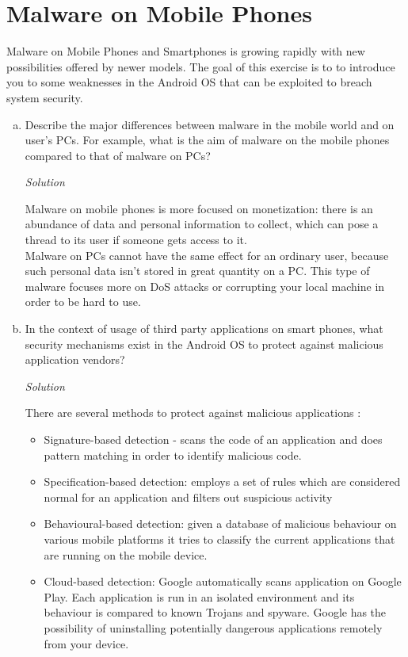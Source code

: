 \documentclass[a4paper,11pt]{article}
\newenvironment{solution}%
{\par\begin{minipage}{\linewidth}{\noindent\small\textit{Solution}\\}\begin{boxedminipage}{\linewidth}}%
{\end{boxedminipage}\end{minipage}\par\bigskip}
\begin{document}
\section{Malware on Mobile Phones}
Malware on Mobile Phones and Smartphones is growing rapidly with new
possibilities offered by newer models. The goal of this exercise is to to
introduce you to some weaknesses in the Android OS that can be exploited to
breach system security. 

\begin{enumerate} [(a)]
\item Describe the major differences between malware in the mobile
  world and on user's PCs. For example, what is the aim of malware on
  the mobile phones compared to that of malware on PCs?
\ifsolution\begin{solution}
Malware on mobile phones is more focused on monetization: there is an abundance of data
and personal information to collect, which can pose a thread to its user if someone gets
access to it.\\
Malware on PCs cannot have the same effect for an ordinary user, because such personal
data isn't stored in great quantity on a PC. This type of malware focuses more on DoS
attacks or corrupting your local machine in order to be hard to use.

\end{solution}\fi

\item In the context of usage of third party applications on smart phones,
  what security mechanisms exist in the Android OS to protect against
  malicious application vendors?
\ifsolution\begin{solution}
There are several methods to protect against malicious applications \cite{MalwareDetection}:
\begin{itemize}
  \item Signature-based detection - scans the code of an application and does
  pattern matching in order to identify malicious code.
  \item Specification-based detection: employs a set of rules which are considered
  normal for an application and filters out suspicious activity
  \item Behavioural-based detection: given a database of malicious behaviour on various
  mobile platforms it tries to classify the current applications that are running on the mobile
  device.
  \item Cloud-based detection: Google automatically scans application on Google Play. Each application
  is run in an isolated environment and its behaviour is compared to known Trojans and spyware.
  Google has the possibility of uninstalling potentially dangerous applications remotely from your
  device.
\end{itemize}
\end{solution}\fi


\end{enumerate}
\end{document}
